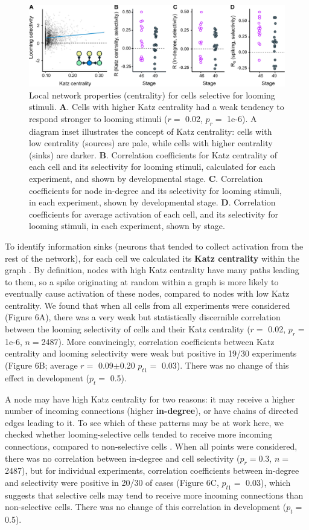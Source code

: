 \documentclass{article}
\begin{document}
\begin{figure}[t!]
\includegraphics[width=\linewidth]{fig6.pdf}
\caption{
Local network properties (centrality) for cells selective for looming stimuli. \textbf{A}. Cells with higher Katz centrality had a weak tendency to respond stronger to looming stimuli ($r =$ 0.02, $p_{r} =$ 1e-6). A diagram inset illustrates the concept of Katz centrality: cells with low centrality (sources) are pale, while cells with higher centrality (sinks) are darker. \textbf{B}. Correlation coefficients for Katz centrality of each cell and its selectivity for looming stimuli, calculated for each experiment, and shown by developmental stage. \textbf{C}. Correlation coefficients for node in-degree and its selectivity for looming stimuli, in each experiment, shown by developmental stage. \textbf{D}. Correlation coefficients for average activation of each cell, and its selectivity for looming stimuli, in each experiment, shown by stage. }
\end{figure}

To identify information sinks (neurons that tended to collect activation from the rest of the network), for each cell we calculated its \textbf{Katz centrality} within the graph \citep{katz1953original, fletcher2018katz}. By definition, nodes with high Katz centrality have many paths leading to them, so a spike originating at random within a graph is more likely to eventually cause activation of these nodes, compared to nodes with low Katz centrality. We found that when all cells from all experiments were considered (Figure 6A), there was a very weak but statistically discernible correlation between the looming selectivity of cells and their Katz centrality ($r =$ 0.02, $p_{r} =$ 1e-6, $n=$2487). More convincingly, correlation coefficients between Katz centrality and looming selectivity were weak but positive in 19/30 experiments (Figure 6B; average $r=$ 0.09$\pm$0.20 $p_{t1}=$ 0.03). There was no change of this effect in development ($p_t=$ 0.5).

A node may have high Katz centrality for two reasons: it may receive a higher number of incoming connections (higher \textbf{in-degree}), or have chains of directed edges leading to it. To see which of these patterns may be at work here, we checked whether looming-selective cells tended to receive more incoming connections, compared to non-selective cells \citep{litwin2014assemblies}. When all points were considered, there was no correlation between in-degree and cell selectivity ($p_{r}=$0.3, $n=$ 2487), but for individual experiments, correlation coefficients between in-degree and selectivity were positive in 20/30 of cases (Figure 6C, $p_{t1}=$ 0.03), which suggests that selective cells may tend to receive more incoming connections than non-selective cells. There was no change of this correlation in development ($p_t=$ 0.5).
\end{document}
